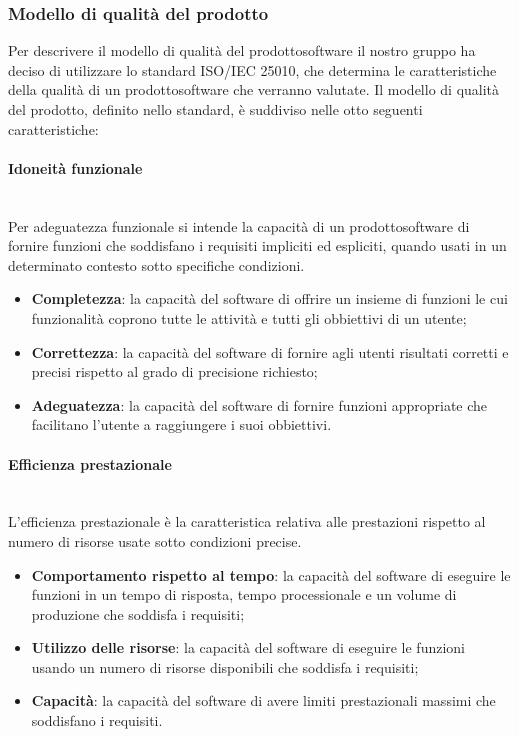 \subsubsection{Modello di qualità del prodotto} 
Per descrivere il modello di qualità del prodotto\glosp software il nostro gruppo ha deciso di utilizzare lo standard ISO/IEC 25010, che determina le caratteristiche della qualità di un prodotto\glosp software che verranno valutate. Il modello di qualità del prodotto\glo , definito nello standard, è suddiviso nelle otto seguenti caratteristiche:
	\paragraph{Idoneità funzionale} \mbox{}\\
	Per adeguatezza funzionale si intende la capacità di un prodotto\glosp software di fornire funzioni che soddisfano i requisiti impliciti ed espliciti, quando usati in un determinato contesto sotto specifiche condizioni.
	\begin{itemize}
		\item \textbf{Completezza}: la capacità del software di offrire un insieme di funzioni le cui funzionalità coprono tutte le attività e tutti gli obbiettivi di un utente;
		\item \textbf{Correttezza}: la capacità del software di fornire agli utenti risultati corretti e precisi rispetto al grado di precisione richiesto;
		\item \textbf{Adeguatezza}: la capacità del software di fornire funzioni appropriate che facilitano l'utente a raggiungere i suoi obbiettivi.
	\end{itemize}
	\paragraph{Efficienza prestazionale} \mbox{}\\
	L'efficienza prestazionale è la caratteristica relativa alle prestazioni rispetto al numero di risorse usate sotto condizioni precise.
	\begin{itemize}
		\item \textbf{Comportamento rispetto al tempo}: la capacità del software di eseguire le funzioni in un tempo di risposta, tempo processionale e un volume di produzione che soddisfa i requisiti;
		\item \textbf{Utilizzo delle risorse}: la capacità del software di eseguire le funzioni usando un numero di risorse disponibili che soddisfa i requisiti;
		\item \textbf{Capacità}: la capacità del software di avere limiti prestazionali massimi che soddisfano i requisiti.
	\end{itemize}
